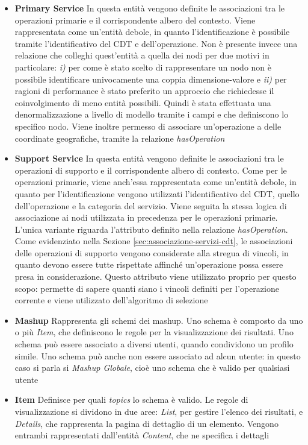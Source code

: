 \begin{itemize}
	\item \textbf{Primary Service} In questa entità vengono definite le associazioni tra le operazioni primarie e il corrispondente albero del contesto. Viene rappresentata come un'entità debole, in quanto l'identificazione è possibile tramite l'identificativo del CDT e dell'operazione. Non è presente invece una relazione che colleghi quest'entità a quella dei nodi per due motivi in particolare: \emph{i)} per come è stato scelto di rappresentare un nodo non è possibile identificare univocamente una coppia dimensione-valore e \emph{ii)} per ragioni di performance è stato preferito un approccio che richiedesse il coinvolgimento di meno entità possibili. Quindi è stata effettuata una denormalizzazione a livello di modello tramite i campi  e  che definiscono lo specifico nodo. Viene inoltre permesso di associare un'operazione a delle coordinate geografiche, tramite la relazione \emph{hasOperation}
	\item \textbf{Support Service} In questa entità vengono definite le associazioni tra le operazioni di supporto e il corrispondente albero di contesto. Come per le operazioni primarie, viene anch'essa rappresentata come un'entità debole, in quanto per l'identificazione vengono utilizzati l'identificativo del CDT, quello dell'operazione e la categoria del servizio. Viene seguita la stessa logica di associazione ai nodi utilizzata in precedenza per le operazioni primarie. L'unica variante riguarda l'attributo  definito nella relazione \emph{hasOperation}. Come evidenziato nella Sezione \ref{sec:associazione-servizi-cdt}, le associazioni delle operazioni di supporto vengono considerate alla stregua di vincoli, in quanto devono essere tutte rispettate affinché un'operazione possa essere presa in considerazione. Questo attributo viene utilizzato proprio per questo scopo: permette di sapere quanti siano i vincoli definiti per l'operazione corrente e viene utilizzato dell'algoritmo di selezione
	\item \textbf{Mashup} Rappresenta gli schemi dei mashup. Uno schema è composto da uno o più \emph{Item}, che definiscono le regole per la visualizzazione dei risultati. Uno schema può essere associato a diversi utenti, quando condividono un profilo simile. Uno schema può anche non essere associato ad alcun utente: in questo caso si parla si \emph{Mashup Globale}, cioè uno schema che è valido per qualsiasi utente
	\item \textbf{Item} Definisce per quali \emph{topics} lo schema è valido. Le regole di visualizzazione si dividono in due aree: \emph{List}, per gestire l'elenco dei risultati, e \emph{Details}, che rappresenta la pagina di dettaglio di un elemento. Vengono entrambi rappresentati dall'entità \emph{Content}, che ne specifica i dettagli

\end{itemize}
